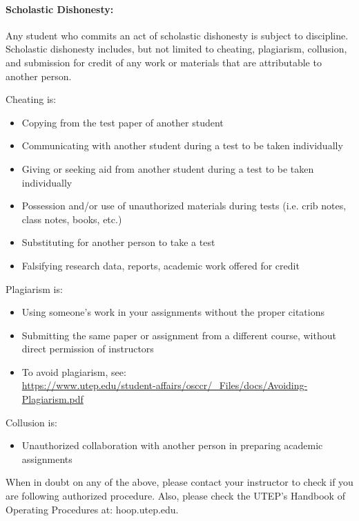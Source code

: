 \documentclass[12pt]{scrartcl}
\begin{document}
\paragraph{Scholastic Dishonesty: }
Any student who commits an act of scholastic dishonesty is subject to discipline. Scholastic dishonesty includes, but not limited to cheating, plagiarism, collusion, and submission for credit of any work or materials that are attributable to another person.

Cheating is:
\begin{itemize}
\item Copying from the test paper of another student
\item Communicating with another student during a test to be taken individually
\item Giving or seeking aid from another student during a test to be taken individually
\item Possession and/or use of unauthorized materials during tests (i.e. crib notes, class notes, books, etc.)
\item Substituting for another person to take a test
\item Falsifying research data, reports, academic work offered for credit
\end{itemize}

Plagiarism is:
\begin{itemize}
\item Using someone’s work in your assignments without the proper citations
\item Submitting the same paper or assignment from a different course, without direct permission of instructors
\item[]\vspace{1em} To avoid plagiarism, see: \\{\footnotesize\url{https://www.utep.edu/student-affairs/osccr/_Files/docs/Avoiding-Plagiarism.pdf}}
\end{itemize}
                               
Collusion is:
\begin{itemize}
\item Unauthorized collaboration with another person in preparing academic assignments
\end{itemize}

\begin{tcolorbox}[colback=red!5,colframe=red!75!black,title=Important!]
When in doubt on any of the above, please contact your instructor to check if you are following authorized procedure. Also, please check the UTEP’s Handbook of Operating Procedures at: hoop.utep.edu. 
\end{tcolorbox}
\end{document}

